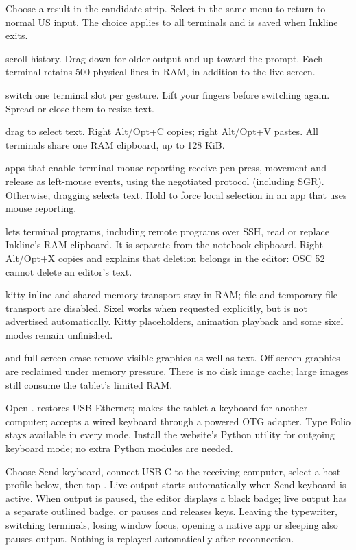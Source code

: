 Choose a result in the candidate strip. Select 
in the same menu to return to normal US input. The choice applies to all
terminals and is saved when Inkline exits.

 scroll history. Drag down for older output and
up toward the prompt. Each terminal retains 500 physical lines in RAM,
in addition to the live screen.

 switch one terminal slot per gesture.
Lift your fingers before switching again. Spread or close them to resize text.

 drag to select text. Right Alt/Opt+C copies;
right Alt/Opt+V pastes. All terminals share one RAM clipboard, up to 128 KiB.

 apps that enable terminal mouse reporting receive pen press,
movement and release as left-mouse events, using the negotiated protocol
(including SGR). Otherwise, dragging selects text. Hold  to force
local selection in an app that uses mouse reporting.

 lets terminal programs, including remote programs over SSH,
read or replace Inkline's RAM clipboard. It is separate from the notebook
clipboard. Right Alt/Opt+X copies and explains that deletion belongs in the
editor: OSC 52 cannot delete an editor's text.

 kitty inline and shared-memory transport stay in RAM;
file and temporary-file transport are disabled. Sixel works when requested
explicitly, but is not advertised automatically. Kitty placeholders,
animation playback and some sixel modes remain unfinished.

 and full-screen erase remove visible graphics as well as text.
Off-screen graphics are reclaimed under memory pressure. There is no disk
image cache; large images still consume the tablet's limited RAM.

Open .  restores USB Ethernet;
 makes the tablet a keyboard for another computer;
 accepts a wired keyboard through a powered OTG adapter.
Type Folio stays available in every mode. Install the website's Python utility
for outgoing keyboard mode; no extra Python modules are needed.

Choose Send keyboard, connect USB-C to the receiving computer, select a host
profile below, then tap . Live output starts automatically
when Send keyboard is active. When output is paused, the editor displays
a black  badge; live output has a separate outlined badge.
 or  pauses and releases keys. Leaving the typewriter,
switching terminals, losing window focus, opening a native app or sleeping
also pauses output. Nothing is replayed automatically after reconnection.

